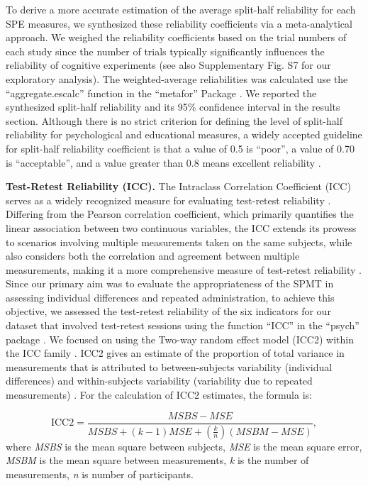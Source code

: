 \documentclass[sn-apa]{sn-jnl}%
\theoremstyle{thmstyleone}%
\theoremstyle{thmstyletwo}%
\theoremstyle{thmstylethree}%
\begin{document}
To derive a more accurate estimation of the average split-half reliability for each SPE measures, we synthesized these reliability coefficients via a meta-analytical approach. We weighed the reliability coefficients based on the trial numbers of each study since the number of trials typically significantly influences the reliability of cognitive experiments \parencite{kucina2023calibration} (see also Supplementary Fig. S7 for our exploratory analysis). The weighted-average reliabilities was calculated use the ``aggregate.escalc” function in the “metafor” Package \parencite{viechtbauer2010conducting}. We reported the synthesized split-half reliability and its 95\% confidence interval in the results section. Although there is no strict criterion for defining the level of split-half reliability for psychological and educational measures, a widely accepted guideline for split-half reliability coefficient is that a value of 0.5 is “poor”, a value of 0.70 is “acceptable”, and a value greater than 0.8 means excellent reliability \parencite{cicchetti1981developing}.  

\textbf{Test-Retest Reliability (ICC).} The Intraclass Correlation Coefficient (ICC) serves as a widely recognized measure for evaluating test-retest reliability \parencite{fisher1992statistical}. Differing from the Pearson correlation coefficient, which primarily quantifies the linear association between two continuous variables, the ICC extends its prowess to scenarios involving multiple measurements taken on the same subjects, while also considers both the correlation and agreement between multiple measurements, making it a more comprehensive measure of test-retest reliability \parencite{koo2016a}. 
Since our primary aim was to evaluate the appropriateness of the SPMT in assessing individual differences and repeated administration, to achieve this objective, we assessed the test-retest reliability of the six indicators for our dataset that involved test-retest sessions using the function ``ICC” in the “psych” package \parencite{revelle2017psych}. We focused on using the Two-way random effect model (ICC2) within the ICC family \parencite{chen2018intraclass,xu2023rex}. ICC2 gives an estimate of the proportion of total variance in measurements that is attributed to between-subjects variability (individual differences) and within-subjects variability (variability due to repeated measurements) \parencite{xu2023rex}. For the calculation of ICC2 estimates, the formula is:

\begin{equation}
	\text{ICC2}=\frac{M S B S-M S E}{M S B S+(k-1) M S E+\left(\frac{k}{n}\right)(M S B M-M S E)},
\end{equation}
where \textit{MSBS} is the mean square between subjects, \textit{MSE} is the mean square error, \textit{MSBM} is the mean square between measurements, \textit{k} is the number of measurements, \textit{n} is number of participants. 
\end{document}
